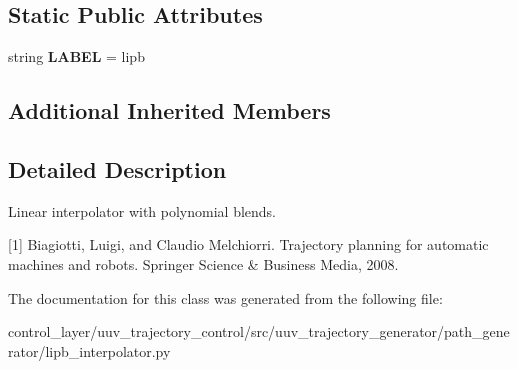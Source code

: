 \subsection*{Static Public Attributes}
\begin{DoxyCompactItemize}
\item 
\mbox{\label{classuuv__trajectory__generator_1_1path__generator_1_1lipb__interpolator_1_1LIPBInterpolator_a0d4bed3882cffbbe5807e5fd81286407}} 
string {\bfseries L\+A\+B\+EL} = \textquotesingle{}lipb\textquotesingle{}
\end{DoxyCompactItemize}
\subsection*{Additional Inherited Members}


\subsection{Detailed Description}
\begin{DoxyVerb}Linear interpolator with polynomial blends.

[1] Biagiotti, Luigi, and Claudio Melchiorri. Trajectory planning for
    automatic machines and robots. Springer Science & Business Media, 2008.
\end{DoxyVerb}
 

The documentation for this class was generated from the following file\+:\begin{DoxyCompactItemize}
\item 
control\+\_\+layer/uuv\+\_\+trajectory\+\_\+control/src/uuv\+\_\+trajectory\+\_\+generator/path\+\_\+generator/lipb\+\_\+interpolator.\+py\end{DoxyCompactItemize}
